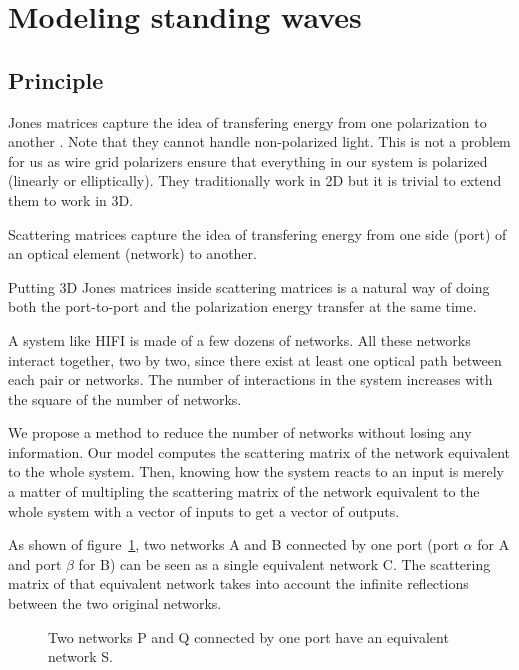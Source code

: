 \documentclass[a4paper,11pt]{article}
\begin{document}

\section{Modeling standing waves}




\subsection{Principle}

Jones matrices capture the idea of transfering energy from one polarization to another \cite{hecht2002optics}.
Note that they cannot handle non-polarized light.
This is not a problem for us as wire grid polarizers ensure that everything in our system is polarized (linearly or elliptically).
They traditionally work in 2D but it is trivial to extend them to work in 3D.

Scattering matrices \cite{siegman1986lasers} capture the idea of transfering energy from one side (port) of an optical element (network) to another.

Putting 3D Jones matrices inside scattering matrices is a natural way of doing both the port-to-port and the polarization energy transfer at the same time.

A system like HIFI is made of a few dozens of networks.
All these networks interact together, two by two, since there exist at least one optical path between each pair or networks.
The number of interactions in the system increases with the square of the number of networks.

We propose a method to reduce the number of networks without losing any information.
Our model computes the scattering matrix of the network equivalent to the whole system.
Then, knowing how the system reacts to an input is merely a matter of multipling the scattering matrix of the network equivalent to the whole system with a vector of inputs to get a vector of outputs.

As shown of figure~\ref{fig:cascading}, two networks A and B connected by one port (port $\alpha$ for A and port $\beta$ for B) can be seen as a single equivalent  network C.
The scattering matrix of that equivalent network takes into account the infinite reflections between the two original networks.
\begin{figure}[hbtp]
    \centering
    
    \caption{\label{fig:cascading}Two networks P and Q connected by one port have an equivalent network S.}
\end{figure}
\end{document}
